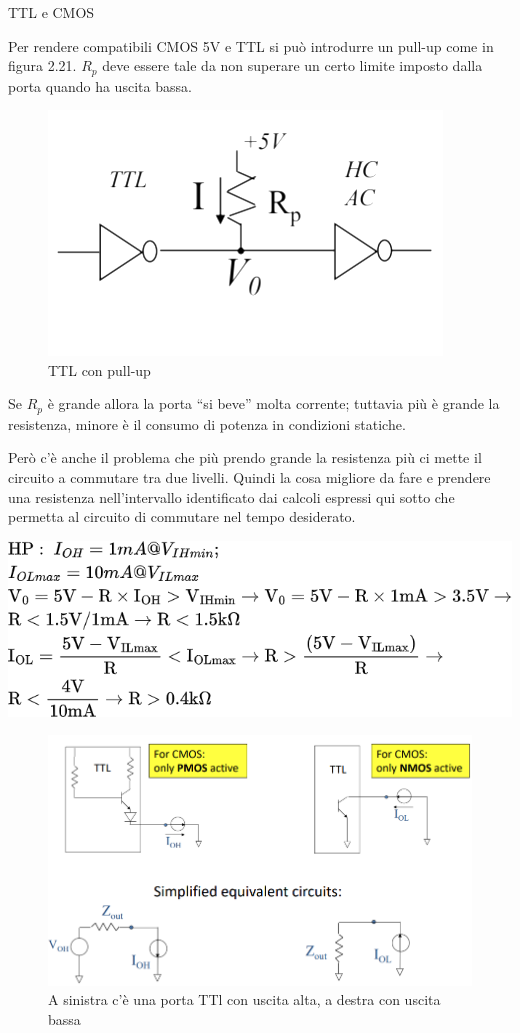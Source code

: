 \documentclass[
]{book}
\begin{document}
TTL e CMOS

Per rendere compatibili CMOS 5V e TTL si può introdurre un pull-up come
in figura 2.21. \(R_{p}\) deve essere tale da non superare un certo
limite imposto dalla porta quando ha uscita bassa.

\begin{figure}
\centering
\includegraphics[width=0.5\linewidth,height=\textheight,keepaspectratio]{immagini/37.png}
\caption{TTL con pull-up}
\end{figure}

Se \(R_{p}\) è grande allora la porta ``si beve'' molta corrente;
tuttavia più è grande la resistenza, minore è il consumo di potenza in
condizioni statiche.

Però c'è anche il problema che più prendo grande la resistenza più ci
mette il circuito a commutare tra due livelli. Quindi la cosa migliore
da fare e prendere una resistenza nell'intervallo identificato dai
calcoli espressi qui sotto che permetta al circuito di commutare nel
tempo desiderato.

\includegraphics[width=0.5\linewidth,height=\textheight,keepaspectratio]{immagini/38.png}

\begin{figure}
\centering
\includegraphics[width=0.5\linewidth,height=\textheight,keepaspectratio]{immagini/39.png}
\caption{A sinistra c'è una porta TTl con uscita alta, a destra con
uscita bassa}
\end{figure}
\end{document}
